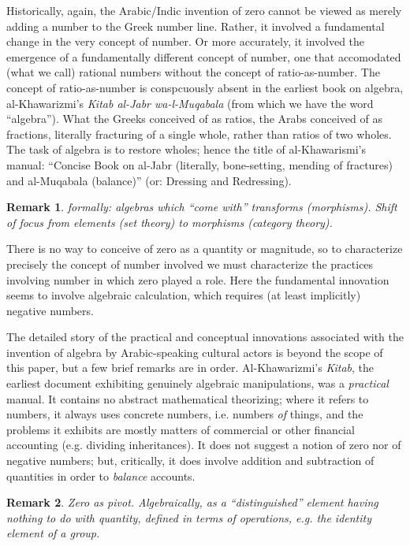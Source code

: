 \documentclass[11pt,twoside]{article}
\newtheorem{remark}{Remark}
\begin{document}
Historically, again, the Arabic/Indic invention of zero cannot be
viewed as merely adding a number to the Greek number line.  Rather, it
involved a fundamental change in the very concept of number.  Or more
accurately, it involved the emergence of a fundamentally different
concept of number, one that accomodated (what we call) rational
numbers without the concept of ratio-as-number.  The concept of
ratio-as-number is conspcuously absent in the earliest book on
algebra, al-Khawarizmi's \textit{Kitab al-Jabr wa-l-Muqabala} (from
which we have the word ``algebra'').  What the Greeks conceived of as
ratios, the Arabs conceived of as fractions, literally fracturing of a
single whole, rather than ratios of two wholes.  The task of algebra is to
restore wholes; hence the title of al-Khawarismi's manual: ``Concise
Book on al-Jabr (literally, bone-setting, mending of fractures) and
al-Muqabala (balance)'' (or: Dressing and Redressing).

\begin{remark}
  formally: algebras which ``come with'' transforms (morphisms).
  Shift of focus from elements (set theory) to morphisms (category
  theory).
\end{remark}

There is no way to conceive of zero as a quantity or magnitude, so to
characterize precisely the concept of number involved we must
characterize the practices involving number in which zero played a
role.  Here the fundamental innovation seems to involve algebraic
calculation, which requires (at least implicitly) negative numbers.

The detailed story of the practical and conceptual innovations
associated with the invention of algebra by Arabic-speaking cultural
actors is beyond the scope of this paper, but a few brief remarks are
in order.  Al-Khawarizmi's \textit{Kitab}, the earliest document
exhibiting genuinely algebraic manipulations, was a \textit{practical}
manual.  It contains no abstract mathematical theorizing; where it
refers to numbers, it always uses concrete numbers, i.e. numbers
\textit{of} things, and the problems it exhibits are mostly matters of
commercial or other financial accounting (e.g. dividing inheritances).
It does not suggest a notion of zero nor of negative numbers; but,
critically, it does involve addition and subtraction of quantities in
order to \textit{balance} accounts.

\begin{remark}
  Zero as pivot.  Algebraically, as a ``distinguished'' element having
  nothing to do with quantity, defined in terms of operations,
  e.g. the identity element of a group.
\end{remark}
\end{document}
